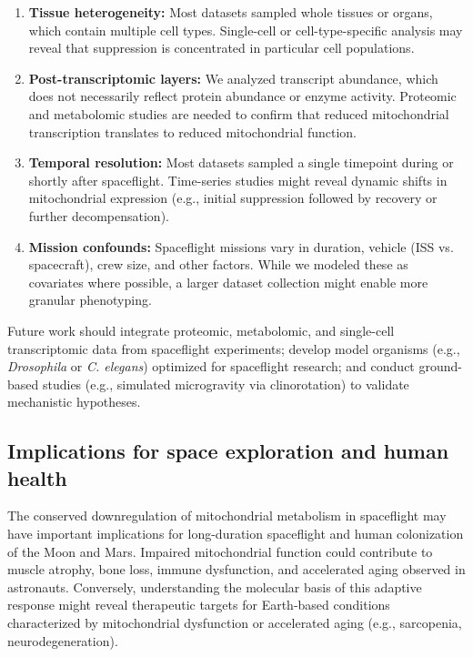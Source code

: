 \documentclass[11pt,a4paper]{article}
\begin{document}
\begin{enumerate}
    \item \textbf{Tissue heterogeneity:} Most datasets sampled whole tissues or organs, 
          which contain multiple cell types. Single-cell or cell-type-specific analysis 
          may reveal that suppression is concentrated in particular cell populations.
    
    \item \textbf{Post-transcriptomic layers:} We analyzed transcript abundance, which 
          does not necessarily reflect protein abundance or enzyme activity. Proteomic 
          and metabolomic studies are needed to confirm that reduced mitochondrial 
          transcription translates to reduced mitochondrial function.
    
    \item \textbf{Temporal resolution:} Most datasets sampled a single timepoint during 
          or shortly after spaceflight. Time-series studies might reveal dynamic shifts 
          in mitochondrial expression (e.g., initial suppression followed by recovery 
          or further decompensation).
    
    \item \textbf{Mission confounds:} Spaceflight missions vary in duration, vehicle 
          (ISS vs. spacecraft), crew size, and other factors. While we modeled these as 
          covariates where possible, a larger dataset collection might enable more 
          granular phenotyping.
\end{enumerate}

Future work should integrate proteomic, metabolomic, and single-cell transcriptomic 
data from spaceflight experiments; develop model organisms (e.g., \textit{Drosophila} 
or \textit{C. elegans}) optimized for spaceflight research; and conduct ground-based 
studies (e.g., simulated microgravity via clinorotation) to validate mechanistic 
hypotheses.

\subsection{Implications for space exploration and human health}
\label{sec:discussion:implications}

The conserved downregulation of mitochondrial metabolism in spaceflight may have 
important implications for long-duration spaceflight and human colonization of the Moon 
and Mars. Impaired mitochondrial function could contribute to muscle atrophy, bone loss, 
immune dysfunction, and accelerated aging observed in astronauts. Conversely, 
understanding the molecular basis of this adaptive response might reveal therapeutic 
targets for Earth-based conditions characterized by mitochondrial dysfunction or 
accelerated aging (e.g., sarcopenia, neurodegeneration).
\end{document}
